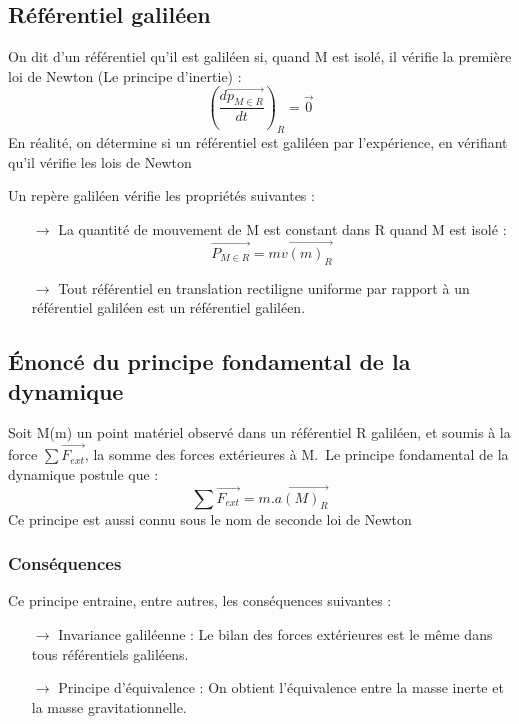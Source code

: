 \subsection{Référentiel galiléen}

\begin{de}
On dit d'un référentiel qu'il est galiléen si, quand M est isolé, il vérifie la première loi de Newton (Le principe d'inertie) : $$\left(\dfrac{d\vec{p_{M \in R}}}{dt}\right)_R = \vec{0}$$
En réalité, on détermine si un référentiel est galiléen par l'expérience, en vérifiant qu'il vérifie les lois de Newton
\end{de}

Un repère galiléen vérifie les propriétés suivantes :
\begin{itemize}
 \item[$\rightarrow$] La quantité de mouvement de M est constant dans R quand M est isolé : $$\vec{P_{M \in R}}=m\vec{v(m)_R}$$
 \item[$\rightarrow$] Tout référentiel en translation rectiligne uniforme par rapport à un référentiel galiléen est un référentiel galiléen.
\end{itemize}

\subsection{\'Enoncé du principe fondamental de la dynamique}

Soit M(m) un point matériel observé dans un référentiel R galiléen, et soumis à la force $\sum \vec{F_{ext}}$, la somme des forces extérieures à M.\
Le principe fondamental de la dynamique postule que :
$$\sum \vec{F_{ext}} = m.\vec{a(M)_R}$$
Ce principe est aussi connu sous le nom de seconde loi de Newton
\subsubsection{Conséquences}
Ce principe entraine, entre autres, les conséquences suivantes :
\begin{itemize}
\item[$\rightarrow$] Invariance galiléenne : Le bilan des forces extérieures est le même dans tous référentiels galiléens.
\item[$\rightarrow$] Principe d'équivalence : On obtient l'équivalence entre la masse inerte et la masse gravitationnelle.
\end{itemize}
